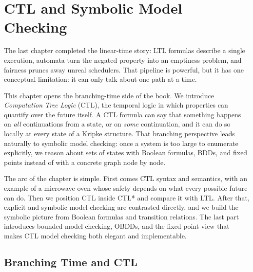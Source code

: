 
\chapter{CTL and Symbolic Model Checking}
\label{ch:ctl-symbolic}


The last chapter completed the linear-time story: LTL formulas describe a
single execution, automata turn the negated property into an emptiness
problem, and fairness prunes away unreal schedulers.  That pipeline is
powerful, but it has one conceptual limitation: it can only talk about one
path at a time.

This chapter opens the branching-time side of the book.  We introduce
\emph{Computation Tree Logic} (CTL), the temporal logic in which properties
can quantify over the future itself.  A CTL formula can say that something
happens on \emph{all} continuations from a state, or on \emph{some}
continuation, and it can do so locally at every state of a Kripke structure.
That branching perspective leads naturally to symbolic model checking: once a
system is too large to enumerate explicitly, we reason about sets of states
with Boolean formulas, BDDs, and fixed points instead of with a concrete graph
node by node.

The arc of the chapter is simple.  First comes CTL syntax and semantics, with
an example of a microwave oven whose safety depends on what every possible
future can do.  Then we position CTL inside CTL* and compare it with LTL.
After that, explicit and symbolic model checking are contrasted directly, and
we build the symbolic picture from Boolean formulas and transition relations.
The last part introduces bounded model checking, OBDDs, and the fixed-point
view that makes CTL model checking both elegant and implementable.


\section{Branching Time and CTL}
\label{sec:ctl-basics}

